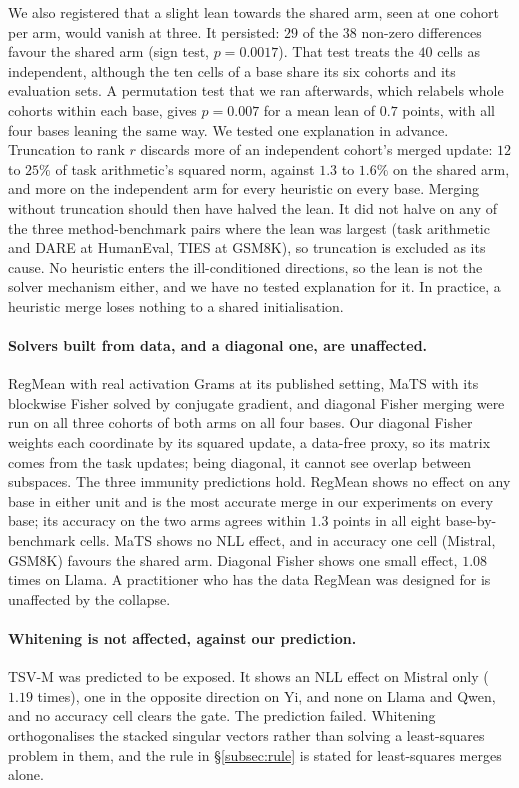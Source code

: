 We also registered that a slight lean towards the shared arm, seen at one
cohort per arm, would vanish at three. It persisted: $29$ of the $38$ non-zero
differences favour the shared arm (sign test, $p = 0.0017$). That test treats
the $40$ cells as independent, although the ten cells of a base share its six
cohorts and its evaluation sets. A permutation test that we ran afterwards,
which relabels whole cohorts within each base, gives $p = 0.007$ for a mean
lean of $0.7$ points, with all four bases leaning the same way. We tested one
explanation in advance. Truncation to rank $r$ discards more of an independent
cohort's merged update: $12$ to $25\%$ of task arithmetic's squared norm,
against $1.3$ to $1.6\%$ on the shared arm, and more on the independent arm for
every heuristic on every base. Merging without truncation should then have
halved the lean. It did not halve on any of the three method-benchmark pairs
where the lean was largest (task arithmetic and DARE at HumanEval, TIES at
GSM8K), so truncation is excluded as its cause. No heuristic enters the
ill-conditioned directions, so the lean is not the solver mechanism either,
and we have no tested explanation for it. In practice, a heuristic merge loses
nothing to a shared initialisation.

\paragraph{Solvers built from data, and a diagonal one, are unaffected.}
RegMean with real activation Grams at its published setting, MaTS with its
blockwise Fisher solved by conjugate gradient, and diagonal Fisher merging were
run on all three cohorts of both arms on all four bases. Our diagonal Fisher
weights each coordinate by its squared update, a data-free proxy, so its matrix
comes from the task updates; being diagonal, it cannot see overlap between
subspaces. The three immunity predictions hold. RegMean shows no effect on any base in either unit and is the most
accurate merge in our experiments on every base; its accuracy on the two arms
agrees within $1.3$ points in all eight base-by-benchmark cells. MaTS shows no
NLL effect, and in accuracy one cell (Mistral, GSM8K) favours the shared arm.
Diagonal Fisher shows one small effect, $1.08$ times on Llama. A practitioner
who has the data RegMean was designed for is unaffected by the collapse.

\paragraph{Whitening is not affected, against our prediction.} TSV-M was
predicted to be exposed. It shows an NLL effect on Mistral only ($1.19$ times),
one in the opposite direction on Yi, and none on Llama and Qwen, and no
accuracy cell clears the gate. The prediction failed. Whitening orthogonalises
the stacked singular vectors rather than solving a least-squares problem in
them, and the rule in \S\ref{subsec:rule} is stated for least-squares merges
alone.

